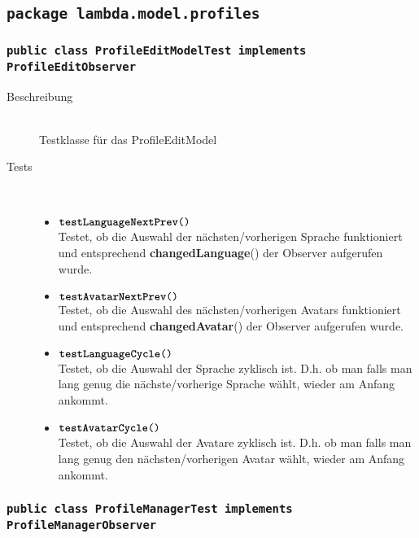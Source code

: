 \subsection{\texttt{package lambda.model.profiles}}

\subsubsection{\normalfont \texttt{public class \textbf{ProfileEditModelTest} implements ProfileEditObserver}}

\begin{description}
\item[Beschreibung] \hfill \\ Testklasse für das ProfileEditModel 

\item[Tests] \hfill \\
	\vspace{-.8cm}
	\begin{itemize}
		\item $\texttt{\textbf{testLanguageNextPrev}()}$ \\ Testet, ob die Auswahl der nächsten/vorherigen Sprache funktioniert und entsprechend \textbf{changedLanguage}() der Observer aufgerufen wurde.
		\item $\texttt{\textbf{testAvatarNextPrev}()}$ \\ Testet, ob die Auswahl des nächsten/vorherigen Avatars funktioniert und entsprechend \textbf{changedAvatar}() der Observer aufgerufen wurde.
		\item $\texttt{\textbf{testLanguageCycle}()}$ \\ Testet, ob die Auswahl der Sprache zyklisch ist. D.h. ob man falls man lang genug die nächste/vorherige Sprache wählt, wieder am Anfang ankommt. 
		\item $\texttt{\textbf{testAvatarCycle}()}$ \\ Testet, ob die Auswahl der Avatare zyklisch ist. D.h. ob man falls man lang genug den nächsten/vorherigen Avatar wählt, wieder am Anfang ankommt. 
	\end{itemize}
\end{description}

\subsubsection{\normalfont \texttt{public class \textbf{ProfileManagerTest} implements ProfileManagerObserver}}

